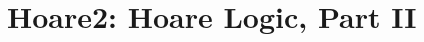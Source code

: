 \documentclass[12pt]{report}
\begin{document}

\begin{coqdoccode}
\end{coqdoccode}
\section{Hoare2: Hoare Logic, Part II}
\end{document}
